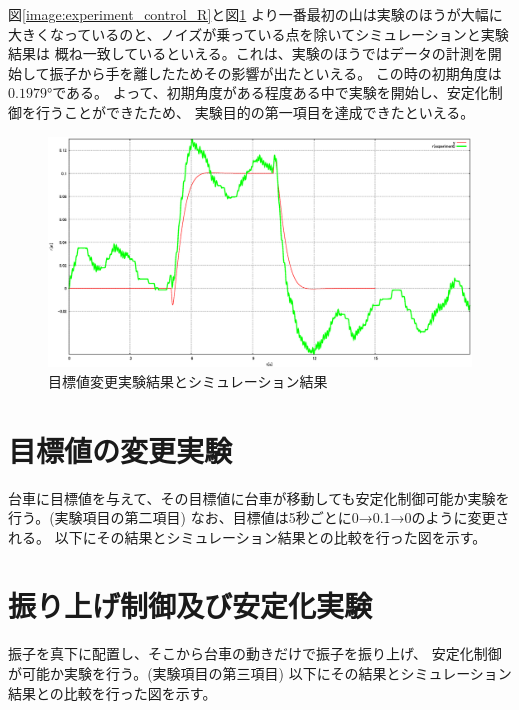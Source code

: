 	図\ref{image:experiment_control_R}と図\ref{image:experiment_control_TH}
	より一番最初の山は実験のほうが大幅に大きくなっているのと、ノイズが乗っている点を除いてシミュレーションと実験結果は
	概ね一致しているといえる。これは、実験のほうではデータの計測を開始して振子から手を離したためその影響が出たといえる。
	この時の初期角度は$0.1979°$である。%
	よって、初期角度がある程度ある中で実験を開始し、安定化制御を行うことができたため、
	実験目的の第一項目を達成できたといえる。
	\begin{figure}[H]
		\centering
		\includegraphics[width=0.8\linewidth]{gazo/experiment_Q55obs30dt05R.eps}
		\caption{目標値変更実験結果とシミュレーション結果}
		\label{image:experiment_control_TH}
	\end{figure}
	
	
\section{目標値の変更実験}
	台車に目標値を与えて、その目標値に台車が移動しても安定化制御可能か実験を行う。(実験項目の第二項目)
	なお、目標値は5秒ごとに0→0.1→0のように変更される。
	以下にその結果とシミュレーション結果との比較を行った図を示す。
	

\section{振り上げ制御及び安定化実験}
	振子を真下に配置し、そこから台車の動きだけで振子を振り上げ、
	安定化制御が可能か実験を行う。(実験項目の第三項目)
	以下にその結果とシミュレーション結果との比較を行った図を示す。

